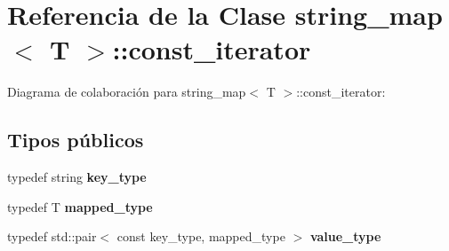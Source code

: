 \hypertarget{classstring__map_1_1const__iterator}{}\section{Referencia de la Clase string\+\_\+map$<$ T $>$\+:\+:const\+\_\+iterator}
\label{classstring__map_1_1const__iterator}


Diagrama de colaboración para string\+\_\+map$<$ T $>$\+:\+:const\+\_\+iterator\+:
\subsection*{Tipos públicos}
\begin{DoxyCompactItemize}
\item 
\mbox{\label{classstring__map_1_1const__iterator_a6882fb8fcbb3532951ef0103c9667671}} 
typedef string {\bfseries key\+\_\+type}
\item 
\mbox{\label{classstring__map_1_1const__iterator_addfcd00ec18f40476d39ee806cffa28e}} 
typedef T {\bfseries mapped\+\_\+type}
\item 
\mbox{\label{classstring__map_1_1const__iterator_a9dd6d12d1ea5aa99beb524f2f26bde10}} 
typedef std\+::pair$<$ const key\+\_\+type, mapped\+\_\+type $>$ {\bfseries value\+\_\+type}
\end{DoxyCompactItemize}
